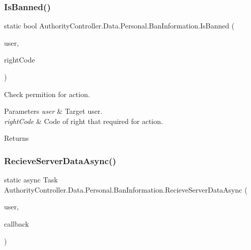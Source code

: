 \subsubsection{\texorpdfstring{Is\+Banned()}{IsBanned()}}
{\footnotesize\ttfamily static bool Authority\+Controller.\+Data.\+Personal.\+Ban\+Information.\+Is\+Banned (\begin{DoxyParamCaption}\item[{\mbox{\hyperlink{class_authority_controller_1_1_data_1_1_personal_1_1_user}{User}}}]{user,  }\item[{string}]{right\+Code }\end{DoxyParamCaption})\hspace{0.3cm}{\ttfamily [static]}}



Check permition for action. 


\begin{DoxyParams}{Parameters}
{\em user} & Target user.\\
\hline
{\em right\+Code} & Code of right that required for action.\\
\hline
\end{DoxyParams}
\begin{DoxyReturn}{Returns}

\end{DoxyReturn}
\mbox{\label{class_authority_controller_1_1_data_1_1_personal_1_1_ban_information_a70cc71c093fb9f5407b60a88a8361a9b}} 
\subsubsection{\texorpdfstring{Recieve\+Server\+Data\+Async()}{RecieveServerDataAsync()}}
{\footnotesize\ttfamily static async Task Authority\+Controller.\+Data.\+Personal.\+Ban\+Information.\+Recieve\+Server\+Data\+Async (\begin{DoxyParamCaption}\item[{\mbox{\hyperlink{class_authority_controller_1_1_data_1_1_personal_1_1_user}{User}}}]{user,  }\item[{System.\+Action$<$ \mbox{\hyperlink{class_authority_controller_1_1_data_1_1_personal_1_1_ban_information}{Ban\+Information}} $>$}]{callback }\end{DoxyParamCaption})\hspace{0.3cm}{\ttfamily [static]}}



